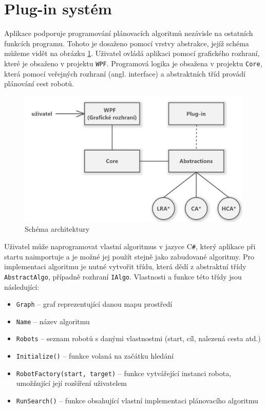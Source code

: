 \section{Plug-in systém}\label{sec:plugins}
Aplikace podporuje programování plánovacích algoritmů nezávisle na ostatních funkcích programu. Tohoto je dosaženo pomocí vrstvy abstrakce, jejíž schéma můžeme vidět na obrázku \ref{obr:pluginsSchema}. Uživatel ovládá aplikaci pomocí grafického rozhraní, které je obsaženo v projektu \texttt{WPF}. Programová logika je obsažena v projektu \texttt{Core}, která pomocí veřejných rozhraní (angl. interface) a abstraktních tříd provádí plánování cest robotů.

\begin{figure}[htb]
	\begin{center}
		\includegraphics*[width=15cm,keepaspectratio]{obr/pluginsSchema}
	\end{center}
	\caption{Schéma architektury }
	\label{obr:pluginsSchema}
\end{figure}

Uživatel může naprogramovat vlastní algoritmus v jazyce C\texttt{\#}, který aplikace při startu naimportuje a je možné jej použít stejně jako zabudované algoritmy. Pro implementaci algoritmu je nutné vytvořit třídu, která dědí z abstraktní třídy \texttt{AbstractAlgo}, případně rozhraní \texttt{IAlgo}. Vlastnosti a funkce této třídy jsou následující:
\begin{itemize}
	\item \texttt{Graph} -- graf reprezentující danou mapu prostředí
	\item \texttt{Name} -- název algoritmu
	\item \texttt{Robots} -- seznam robotů s danými vlastnostmi (start, cíl, nalezená cesta atd.)
	\item \texttt{Initialize()} -- funkce volaná na začátku hledání
	\item \texttt{RobotFactory(start, target)} -- funkce vytvářející instanci robota, umožňující její rozšíření uživatelem
	\item \texttt{RunSearch()} -- funkce obsahující vlastní implementaci plánovacího algoritmu
\end{itemize}

